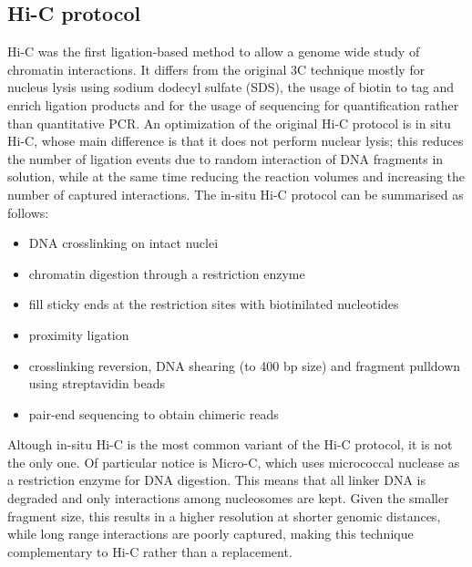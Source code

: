 \subsection{Hi-C protocol}
Hi-C was the first ligation-based method to allow a genome wide study of chromatin interactions. It differs from the original 3C technique mostly for nucleus lysis using sodium dodecyl sulfate (SDS), the usage of biotin to tag and enrich ligation products and for the usage of sequencing for quantification rather than quantitative PCR\cite{hicoriginal2009}. An optimization of the original Hi-C protocol is in situ Hi-C, whose main difference is that it does not perform nuclear lysis; this reduces the number of ligation events due to random interaction of DNA fragments in solution, while at the same time reducing the reaction volumes and increasing the number of captured interactions\cite{insituhic2014}. The in-situ Hi-C protocol can be summarised as follows:

\begin{itemize}\tightlist
  \item DNA crosslinking on intact nuclei
  \item chromatin digestion through a restriction enzyme
  \item fill sticky ends at the restriction sites with biotinilated nucleotides
  \item proximity ligation
  \item crosslinking reversion, DNA shearing (to 400 bp size) and fragment pulldown using streptavidin beads
  \item pair-end sequencing to obtain chimeric reads
\end{itemize}
 
Altough in-situ Hi-C is the most common variant of the Hi-C protocol, it is not the only one. Of particular notice is Micro-C\cite{microc2015}, which uses micrococcal nuclease as a restriction enzyme for DNA digestion. This means that all linker DNA is degraded and only interactions among nucleosomes are kept. Given the smaller fragment size, this results in a higher resolution at shorter genomic distances, while long range interactions are poorly captured, making this technique complementary to Hi-C rather than a replacement.

